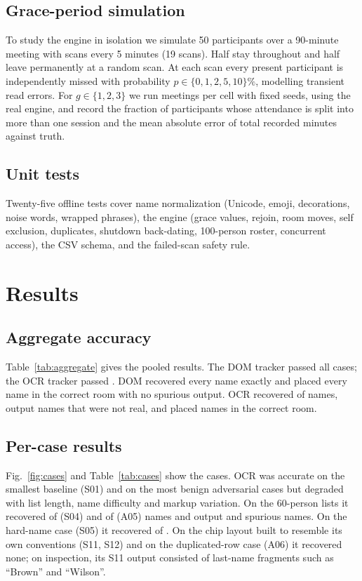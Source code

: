 \documentclass[conference]{IEEEtran}
\begin{document}
\subsection{Grace-period simulation}
To study the engine in isolation we simulate 50 participants over a 90-minute meeting with scans every 5 minutes (19 scans). Half stay throughout and half leave permanently at a random scan. At each scan every present participant is independently missed with probability $p\in\{0,1,2,5,10\}\%$, modelling transient read errors. For $g\in\{1,2,3\}$ we run \simTrials{} meetings per cell with fixed seeds, using the real engine, and record the fraction of participants whose attendance is split into more than one session and the mean absolute error of total recorded minutes against truth.

\subsection{Unit tests}
Twenty-five offline tests cover name normalization (Unicode, emoji, decorations, noise words, wrapped phrases), the engine (grace values, rejoin, room moves, self exclusion, duplicates, shutdown back-dating, 100-person roster, concurrent access), the CSV schema, and the failed-scan safety rule.

\section{Results}\label{sec:results}
\subsection{Aggregate accuracy}
Table~\ref{tab:aggregate} gives the pooled results. The DOM tracker passed all \domPass{} cases; the OCR tracker passed \ocrPass{}. DOM recovered every name exactly and placed every name in the correct room with no spurious output. OCR recovered \ocrFound{} of \nSlots{} names, output \ocrSpur{} names that were not real, and placed \ocrRoomN{} names in the correct room.



\subsection{Per-case results}
Fig.~\ref{fig:cases} and Table~\ref{tab:cases} show the cases. OCR was accurate on the smallest baseline (S01) and on the most benign adversarial cases but degraded with list length, name difficulty and markup variation. On the 60-person lists it recovered \SZeroFourOcrFound{} of \SZeroFourTruth{} (S04) and \AZeroFiveOcrFound{} of \AZeroFiveTruth{} (A05) names and output \SZeroFourOcrSpur{} and \AZeroFiveOcrSpur{} spurious names. On the hard-name case (S05) it recovered \SZeroFiveOcrFound{} of \SZeroFiveTruth{}. On the chip layout built to resemble its own conventions (S11, S12) and on the duplicated-row case (A06) it recovered none; on inspection, its S11 output consisted of last-name fragments such as ``Brown'' and ``Wilson''.
\end{document}
